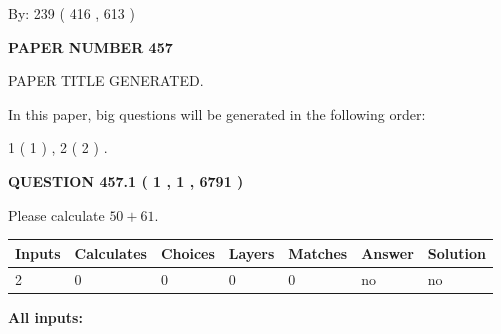 \documentclass[12pt]{article}
\begin{document}
   
\hspace{1.0in} By: 
 239 ( 416 ,  613 )
   
   
   
   
\newpage 
\setcounter{page}{ 
   457001 } 
   
   
   
   
 {\textbf{ \Large{ PAPER NUMBER  457  }}}
   
   
\vspace{0.2in}
   
   
   
   
   
   
   
   
 \vspace{0.2in}
 
 
 
 
   
   
 PAPER TITLE GENERATED.
   
   
   
\vspace{0.2in}
   
In this paper, big questions will be generated in the following order: 
   
   
   1 ( 1 )
 ,
   2 ( 2 )
 .
  
\vspace{0.2in}
  
{\textbf{\Large{QUESTION
457.1 
 ( 1 , 1 , 6791 )
}}}
  
  
 
Please calculate $ %
50 +  %
61 $.
 
 
   
   
   
   
\noindent\begin{tabular}{|l|l|l|l|l|l|l|}
 \hline
Inputs & Calculates & Choices & Layers & Matches & Answer & Solution \\ \hline
 2  & 
 0  & 
 0
  & 
 0  & 
 0  & 
  no & 
  no 
  \\ \hline
 \end{tabular}
   
   
   
   
\noindent{}
   
   
   
   
\noindent\vspace{0.1in}\hspace{-0.08in} {\textbf{\Large{All inputs: }}}
   
\end{document}
